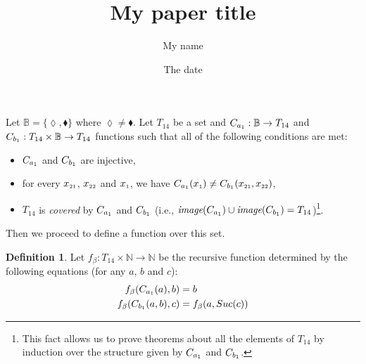 \documentclass{article}
\title{My paper title}
\author{My name}
\date{The date}
\theoremstyle{definition}
\newtheorem{definition}{Definition}
\begin{document}
\maketitle

Let $\mathbb{B} = \{\lozenge, \blacklozenge \}$ where $\lozenge \neq \blacklozenge$. Let $T_{14}$ be a set and $C_{a_{\mbox{\tiny 1}}} : \mathbb{B} \to T_{14}$ and $C_{b_{\mbox{\tiny 1}}} : T_{14} \times 
                                  \mathbb{B} \to T_{14}$ functions such that all of the following conditions are met: 
\begin{itemize}
\item $C_{a_{\mbox{\tiny 1}}}$ and $C_{b_{\mbox{\tiny 1}}}$ are injective, 
\item for every $x_{\mbox{\tiny 21}}$, $x_{\mbox{\tiny 22}}$ and $x_{\mbox{\tiny 1}}$, we have $C_{a_{\mbox{\tiny 1}}}(x_{\mbox{\tiny 1}}) \neq C_{b_{\mbox{\tiny 1}}}(x_{\mbox{\tiny 21}}, x_{\mbox{\tiny 22}})$,
\item $T_{14}$  is \textit{covered} by $C_{a_{\mbox{\tiny 1}}}$ and $C_{b_{\mbox{\tiny 1}}}$ (i.e., $\mbox{\it image}(C_{a_{\mbox{\tiny 1}}})\cup\mbox{\it image}(C_{b_{\mbox{\tiny 1}}}) = T_{14}$)\footnote{This fact allows us to prove theorems about all the elements of $T_{14}$ by induction over the structure given by $C_{a_{\mbox{\tiny 1}}}$ and $C_{b_{\mbox{\tiny 1}}}$.}.
\end{itemize}

\noindent Then we proceed to define a function over this set.

\begin{definition}
Let $f_{\beta} : T_{14} \times  \mathbb{N} \to \mathbb{N}$ be the recursive function determined by the following equations (for any $a$, $b$ and $c$): 
\begin{align}
f_{\beta}(C_{a_{\mbox{\tiny 1}}}(a), b) &= b \label{f_2.simps_1}\\
f_{\beta}(C_{b_{\mbox{\tiny 1}}}(a, b), c) &= f_{\beta}(a, Suc(c)) \label{f_2.simps_2}
\end{align}
\end{definition}
\end{document}

